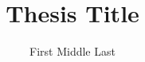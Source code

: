 \documentclass[
	pdfa,
	oneside,
	chapterbib,
	saychapapp,
	fancyheaders]{ualberta}
\title{Thesis Title}                         %
\author{First Middle Last}                   %
\begin{document}
	\maketitle                   %
	\makeabstract                %
	\makepreface                 %
		\makededicationandquote      %
	\acknowledgements            %

	\onehalfspacing              %

	\tableofcontents             %
	\listoftables                %
	\listoffigures               %
	\listofplates                %
	\listofsymbols               %
	\abbreviations               %
	\glsaddall                   %
	\generateglossary            %


	\bodyoftext %

	\truedoublespacing     %

%
% 
\end{document}
